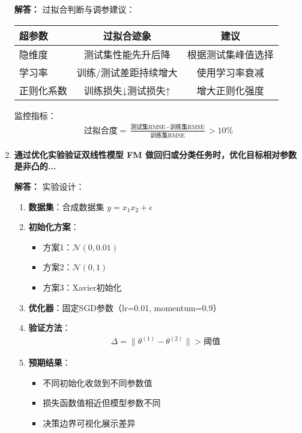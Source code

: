 \documentclass[a4paper,12pt]{book}
\begin{document}
\begin{enumerate}[label=\arabic*.]
    \textbf{解答：} 过拟合判断与调参建议：
    \begin{table}[h]
        \centering
        \begin{tabular}{|l|c|c|}
            \hline
            \textbf{超参数} & \textbf{过拟合迹象} & \textbf{建议} \\
            \hline
            隐维度 & 测试集性能先升后降 & 根据测试集峰值选择 \\
            学习率 & 训练/测试差距持续增大 & 使用学习率衰减 \\
            正则化系数 & 训练损失↓测试损失↑ & 增大正则化强度 \\
            \hline
        \end{tabular}
    \end{table}
    
    监控指标：
    \begin{align*}
        \text{过拟合度} = \frac{\text{测试集RMSE} - \text{训练集RMSE}}{\text{训练集RMSE}} > 10\%
    \end{align*}

    \item \textbf{通过优化实验验证双线性模型 FM 做回归或分类任务时，优化目标相对参数是非凸的...}
    
    \textbf{解答：} 实验设计：
    \begin{enumerate}
        \item \textbf{数据集}：合成数据集 \( y = x_1x_2 + \epsilon \)
        \item \textbf{初始化方案}：
        \begin{itemize}
            \item 方案1：\(\mathcal{N}(0, 0.01)\)
            \item 方案2：\(\mathcal{N}(0, 1)\)
            \item 方案3：Xavier初始化
        \end{itemize}
        \item \textbf{优化器}：固定SGD参数（lr=0.01, momentum=0.9）
        \item \textbf{验证方法}：
        \begin{align*}
        \Delta = \| \theta^{(1)} - \theta^{(2)} \| > \text{阈值}
        \end{align*}
        \item \textbf{预期结果}：
        \begin{itemize}
            \item 不同初始化收敛到不同参数值
            \item 损失函数值相近但模型参数不同
            \item 决策边界可视化展示差异
        \end{itemize}
    \end{enumerate}
\end{enumerate}
\end{document}
